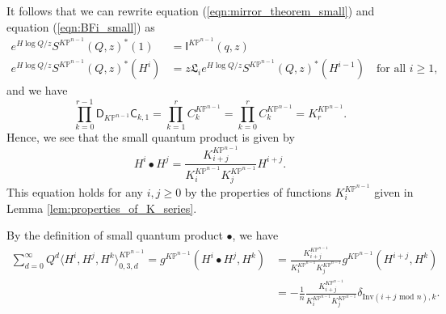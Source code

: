 \documentclass[12pt]{amsart}
\numberwithin{equation}{section}
\newcommand{\KP}{K\mathbb{P}}
\begin{document}
It follows that we can rewrite equation (\ref{eqn:mirror_theorem_small}) and equation (\ref{eqn:BFi_small}) as
\begin{equation}\label{eqn:Birkhoff_Fact_with_L_i}
\begin{split}
e^{H\log Q/z}S^{\KP^{n-1}}(Q, z)^*(1)&=\mathsf{I}^{\KP^{n-1}}(q,z)\\
e^{H\log Q/z}S^{\KP^{n-1}}(Q, z)^*(H^i)&=z\mathfrak{L}_ie^{H\log Q/z}S^{\KP^{n-1}}(Q, z)^*(H^{i-1})\quad\text{for all }i\geq{1},
\end{split}
\end{equation}
and we have 
\begin{equation*}
\prod_{k=0}^{r-1}\mathsf{D}_{K\mathbb{P}^{n-1}}\mathsf{C}_{k,1}=\prod_{k=1}^rC^{\KP^{n-1}}_k=\prod_{k=0}^rC^{\KP^{n-1}}_k=K^{\KP^{n-1}}_r.
\end{equation*}
Hence, we see that the small quantum product is given by
\begin{equation*}
H^i\bullet H^j=\frac{K^{\KP^{n-1}}_{i+j}}{K^{\KP^{n-1}}_{i}K^{\KP^{n-1}}_{j}} H^{i+j}.
\end{equation*}
This equation holds for any $i,j\geq{0}$ by the properties of functions $K^{\KP^{n-1}}_{i}$ given in Lemma \ref{lem:properties_of_K_series}.

By the definition of small quantum product $\bullet$, we have 
\begin{equation}\label{eqn:3ptGWKP}
\begin{split}
\sum_{d=0}^{\infty}Q^d\langle H^i, H^j, H^k\rangle_{0,3,d}^{\KP^{n-1}}=g^{\KP^{n-1}}(H^i\bullet H^j, H^k)
&=\frac{K^{\KP^{n-1}}_{i+j}}{K^{\KP^{n-1}}_{i}K^{\KP^{n-1}}_{j}} g^{\KP^{n-1}}(H^{i+j}, H^k)\\
&=-\frac{1}{n}\frac{K^{\KP^{n-1}}_{i+j}}{K^{\KP^{n-1}}_{i}K^{\KP^{n-1}}_{j}}\delta_{\text{Inv}(i+j \text{ mod }n), k}.
\end{split}
\end{equation}
\end{document}
